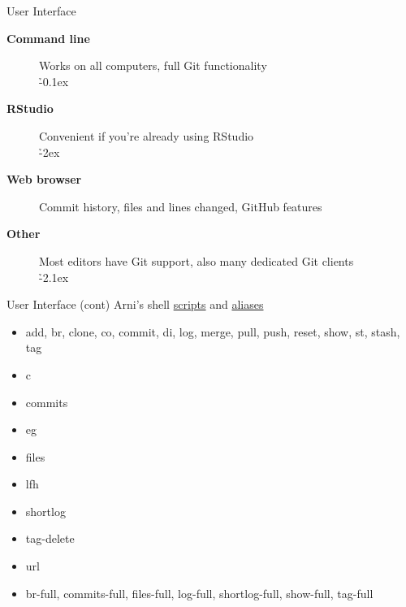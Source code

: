 \documentclass[aspectratio=169]{beamer}
\begin{document}
\begin{frame}{User Interface}\small
  \begin{description}
    \item[\bf Command line] Works on all computers, full Git
    functionality\\[0.8ex]
    \h{-0.1ex}\\[5ex]
    \item[\bf RStudio] Convenient if you're already using RStudio\\[0.8ex]
    \h{-2ex}\\[5ex]
    \item[\bf Web browser] Commit history, files and lines changed, GitHub
    features\\[5ex]
    \item[\bf Other] Most editors have Git support, also many dedicated Git
    clients\\[0.8ex]
    \h{-2.1ex}
  \end{description}
\end{frame}


\begin{frame}{User Interface (cont)}\small
  Arni's shell {\blue\href{https://github.com/arni-magnusson/bin}{scripts}} and
  {\blue
    \href{https://github.com/arni-magnusson/dot/blob/master/.bashrc}{aliases}}
  \begin{itemize}\fns
    \item[] add, br, clone, co, commit, di, log, merge, pull, push, reset, show,
    st, stash, tag
    \item[] c 
    \item[] commits 
    \item[] eg 
    \item[] files 
    \item[] lfh 
    \item[] shortlog 
    \item[] tag-delete 
    \item[] url 
    \item[] br-full, commits-full, files-full, log-full, shortlog-full,
    show-full, tag-full
  \end{itemize}
\end{frame}
\end{document}
